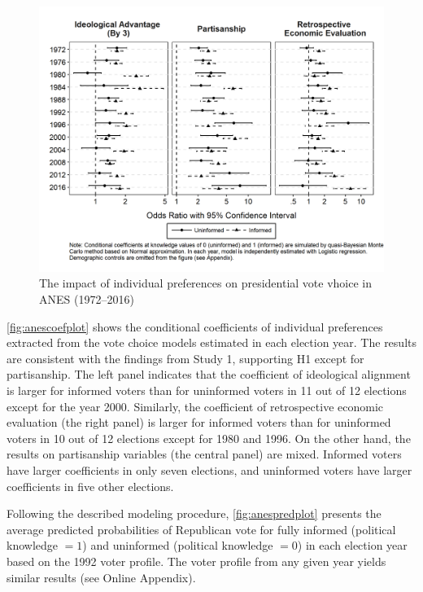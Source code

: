 \documentclass[letterpaper, 12pt]{article}
\begin{document}
    \begin{figure}[t!]
        \caption{The impact of individual preferences on presidential vote vhoice in ANES (1972--2016)}
        \label{fig:anescoefplot}
        \includegraphics[width=\linewidth]{../outputs/m1sq_anescoefplot.png}
    \end{figure}

    \par \autoref{fig:anescoefplot} shows the conditional coefficients of individual preferences extracted from the vote choice models estimated in each election year. The results are consistent with the findings from Study 1, supporting H1 except for partisanship. The left panel indicates that the coefficient of ideological alignment is larger for informed voters than for uninformed voters in 11 out of 12 elections except for the year 2000. Similarly, the coefficient of retrospective economic evaluation (the right panel) is larger for informed voters than for uninformed voters in 10 out of 12 elections except for 1980 and 1996. On the other hand, the results on partisanship variables (the central panel) are mixed. Informed voters have larger coefficients in only seven elections, and uninformed voters have larger coefficients in five other elections.

    \par Following the described modeling procedure, \autoref{fig:anespredplot} presents the average predicted probabilities of Republican vote for fully informed (political knowledge $=1$) and uninformed (political knowledge $=0$) in each election year based on the 1992 voter profile. The voter profile from any given year yields similar results (see Online Appendix). 
\end{document}
